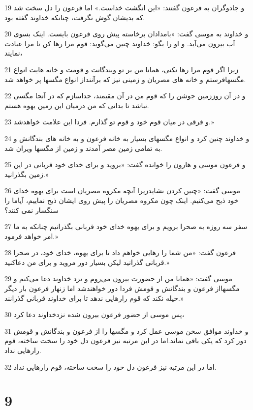 \par 19 و جادوگران به فرعون گفتند: «این انگشت خداست.» اما فرعون را دل سخت شد که بدیشان گوش نگرفت، چنانکه خداوند گفته بود.
\par 20 و خداوند به موسی گفت: «بامدادان برخاسته پیش روی فرعون بایست. اینک بسوی آب بیرون می‌آید. و او را بگو: خداوند چنین می‌گوید: قوم مرا رها کن تا مرا عبادت نمایند،
\par 21 زیرا اگر قوم مرا رها نکنی، همانا من بر تو وبندگانت و قومت و خانه هایت انواع مگسهافرستم و خانه های مصریان و زمینی نیز که برآننداز انواع مگسها پر خواهد شد.
\par 22 و در آن روززمین جوشن را که قوم من در آن مقیمند، جداسازم که در آنجا مگسی نباشد تا بدانی که من درمیان این زمین یهوه هستم.
\par 23 و فرقی در میان قوم خود و قوم تو گذارم. فردا این علامت خواهدشد.»
\par 24 و خداوند چنین کرد و انواع مگسهای بسیار به خانه فرعون و به خانه های بندگانش و به تمامی زمین مصر آمدند و زمین از مگسها ویران شد.
\par 25 و فرعون موسی و هارون را خوانده گفت: «بروید و برای خدای خود قربانی در این زمین بگذرانید.»
\par 26 موسی گفت: «چنین کردن نشایدزیرا آنچه مکروه مصریان است برای یهوه خدای خود ذبح می‌کنیم. اینک چون مکروه مصریان را پیش روی ایشان ذبح نماییم، آیاما را سنگسار نمی کنند؟
\par 27 سفر سه روزه به صحرا برویم و برای یهوه خدای خود قربانی بگذرانیم چنانکه به ما امر خواهد فرمود.»
\par 28 فرعون گفت: «من شما را رهایی خواهم داد تا برای یهوه، خدای خود، در صحرا قربانی گذرانید لیکن بسیار دور مروید و برای من دعاکنید.»
\par 29 موسی گفت: «همانا من از حضورت بیرون می‌روم و نزد خداوند دعا می‌کنم و مگسهااز فرعون و بندگانش و قومش فردا دور خواهندشد اما زنهار فرعون بار دیگر حیله نکند که قوم رارهایی ندهد تا برای خداوند قربانی گذرانند.»
\par 30 پس موسی از حضور فرعون بیرون شده نزدخداوند دعا کرد،
\par 31 و خداوند موافق سخن موسی عمل کرد و مگسها را از فرعون و بندگانش و قومش دور کرد که یکی باقی نماند.اما در این مرتبه نیز فرعون دل خود را سخت ساخته، قوم رارهایی نداد.
\par 32 اما در این مرتبه نیز فرعون دل خود را سخت ساخته، قوم رارهایی نداد.
 
\chapter{9}

